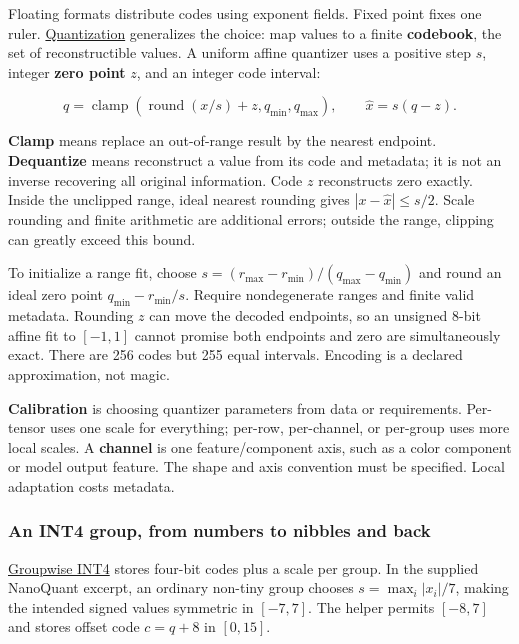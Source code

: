 \hypertarget{01-foundations-i-ch001-a-smaller-codebook-tailored-to-the-data}{}

Floating formats distribute codes using exponent fields. Fixed point fixes one ruler. \hyperref[appendix-d5da3eaabaef]{Quantization} generalizes the choice: map values to a finite \textbf{codebook}, the set of reconstructible values. A uniform affine quantizer uses a positive step \(s\), integer \textbf{zero point} \(z\), and an integer code interval:

\[
q=\operatorname{clamp}\!\left(\operatorname{round}(x/s)+z,q_{\min},q_{\max}\right),
\qquad
\widehat x=s(q-z).
\]

\textbf{Clamp} means replace an out-of-range result by the nearest endpoint. \textbf{Dequantize} means reconstruct a value from its code and metadata; it is not an inverse recovering all original information. Code \(z\) reconstructs zero exactly. Inside the unclipped range, ideal nearest rounding gives \(|x-\widehat x|\le s/2\). Scale rounding and finite arithmetic are additional errors; outside the range, clipping can greatly exceed this bound.

To initialize a range fit, choose \(s=(r_{\max}-r_{\min})/(q_{\max}-q_{\min})\) and round an ideal zero point \(q_{\min}-r_{\min}/s\). Require nondegenerate ranges and finite valid metadata. Rounding \(z\) can move the decoded endpoints, so an unsigned 8-bit affine fit to \([-1,1]\) cannot promise both endpoints and zero are simultaneously exact. There are 256 codes but 255 equal intervals. Encoding is a declared approximation, not magic.

\textbf{Calibration} is choosing quantizer parameters from data or requirements. Per-tensor uses one scale for everything; per-row, per-channel, or per-group uses more local scales. A \textbf{channel} is one feature/component axis, such as a color component or model output feature. The shape and axis convention must be specified. Local adaptation costs metadata.

\subsubsection{An INT4 group, from numbers to nibbles and back}\label{01-foundations-i-ch001-an-int4-group-from-numbers-to-nibbles-and-back}

\hypertarget{01-foundations-i-ch001-an-int4-group-from-numbers-to-nibbles-and-back}{}

\hyperref[appendix-638204c40e8b]{Groupwise INT4} stores four-bit codes plus a scale per group. In the supplied NanoQuant excerpt, an ordinary non-tiny group chooses \(s=\max_i|x_i|/7\), making the intended signed values symmetric in \([-7,7]\). The helper permits \([-8,7]\) and stores offset code \(c=q+8\) in \([0,15]\).

